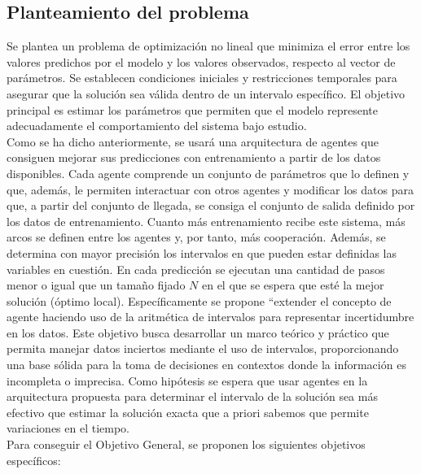\subsection*{Planteamiento del problema}

Se plantea un problema de optimización no lineal que minimiza el error entre los valores predichos por el modelo y los valores observados, respecto al vector de parámetros. Se establecen condiciones iniciales y restricciones temporales para asegurar que la solución sea válida dentro de un intervalo específico. El objetivo principal es estimar los parámetros que permiten que el modelo represente adecuadamente el comportamiento del sistema bajo estudio. \\

Como se ha dicho anteriormente, se usará una arquitectura de agentes que consiguen mejorar sus predicciones con entrenamiento a partir de los datos disponibles. Cada agente comprende un conjunto de parámetros que lo definen y que, además, le permiten interactuar con otros agentes y modificar los datos para que, a partir del conjunto de llegada, se consiga el conjunto de salida definido por los datos de entrenamiento. Cuanto más entrenamiento recibe este sistema, más arcos se definen entre los agentes y, por tanto, más cooperación. Además, se determina con mayor precisión los intervalos en que pueden estar definidas las variables en cuestión. En cada predicción se ejecutan una cantidad de pasos menor o igual que un tamaño fijado $N$ en el que se espera que esté la mejor solución (óptimo local). Específicamente se propone ``extender el concepto de agente haciendo uso de la aritmética de intervalos para representar incertidumbre en los datos. Este objetivo busca desarrollar un marco teórico y práctico que permita manejar datos inciertos mediante el uso de intervalos, proporcionando una base sólida para la toma de decisiones en contextos donde la información es incompleta o imprecisa. Como hipótesis se espera que usar agentes en la arquitectura propuesta para determinar el intervalo de la solución sea más efectivo que estimar la solución exacta que a priori sabemos que permite variaciones en el tiempo. \\

Para conseguir el Objetivo General, se proponen los siguientes objetivos específicos:

